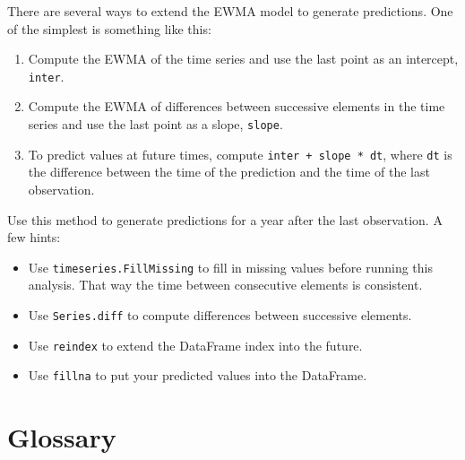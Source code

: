 \begin{exercise}
There are several ways to extend the EWMA model to generate predictions.
One of the simplest is something like this:

\begin{enumerate}

\item Compute the EWMA of the time series and use the last point
as an intercept, {\tt inter}.

\item Compute the EWMA of differences between successive elements in
the time series and use the last point as a slope, {\tt slope}.

\item To predict values at future times, compute {\tt inter + slope * dt},
where {\tt dt} is the difference between the time of the prediction and
the time of the last observation.

\end{enumerate}

Use this method to generate predictions for a year after the last
observation.  A few hints:

\begin{itemize}

\item Use {\tt timeseries.FillMissing} to fill in missing values
before running this analysis.  That way the time between consecutive
elements is consistent.

\item Use {\tt Series.diff} to compute differences between successive
elements.

\item Use {\tt reindex} to extend the DataFrame index into the future.

\item Use {\tt fillna} to put your predicted values into the DataFrame.

\end{itemize}

\end{exercise}


\section{Glossary}

